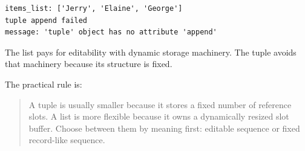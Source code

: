 \begin{verbatim}
items_list: ['Jerry', 'Elaine', 'George']
tuple append failed
message: 'tuple' object has no attribute 'append'
\end{verbatim}

The list pays for editability with dynamic storage machinery. The tuple avoids that machinery because its structure is fixed.

The practical rule is:

\begin{quote}
A tuple is usually smaller because it stores a fixed number of reference slots. A list is more flexible because it owns a dynamically resized slot buffer. Choose between them by meaning first: editable sequence or fixed record-like sequence.
\end{quote}